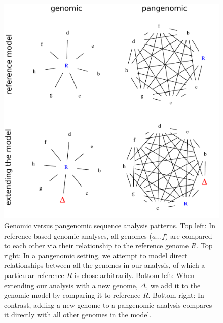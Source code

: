 \begin{figure}[h]
    \includegraphics[width=1.0\textwidth]{figures/fig1.pdf}
    \caption{\label{fig:models} Genomic versus pangenomic sequence analysis patterns.
      Top left: In reference based genomic analyses, all genomes ($a \ldots f$) are compared to each other via their relationship to the reference genome $R$.
      Top right: In a pangenomic setting, we attempt to model direct relationships between all the genomes in our analysis, of which a particular reference $R$ is chose arbitrarily.
      Bottom left: When extending our analysis with a new genome, $\Delta$, we add it to the genomic model by comparing it to reference $R$.
      Bottom right: In contrast, adding a new genome to a pangenomic analysis compares it directly with all other genomes in the model.
    }
\end{figure}





